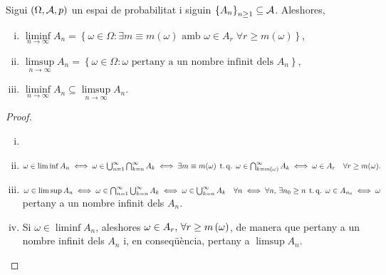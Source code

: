 \begin{prop}
    Sigui $\left(\Omega,\mathcal{A},p\right)$ un espai de probabilitat i siguin $\left\{ A_n\right\}_{n\geq1} \subseteq \mathcal{A}$. Aleshores,
    \begin{enumerate}[i)]
        \item $\liminf\limits_{n\to\infty} A_n= \left\{\omega\in\Omega\colon \exists m\equiv m(\omega) \text{ amb } \omega\in A_r \;\forall r\geq m(\omega)\right\}$,
        \item $\limsup\limits_{n\to\infty} A_n= \left\{\omega\in\Omega \colon \omega \text{ pertany a un nombre infinit dels } A_n\right\}$,
        \item $\liminf\limits_{n\to\infty} A_n \subseteq \limsup\limits_{n\to\infty} A_n$.
    \end{enumerate}
\end{prop}
\begin{proof}
    \begin{enumerate}[i)]
        \item[]
        \item $\omega\in\liminf{A_n} \iff \omega\in\bigcup_{n=1}^{\infty}\bigcap_{k=n}^{\infty} A_k \iff
        \exists m \equiv m(\omega) \operatorname{\;t.q.\;} \omega\in\bigcap_{k=m(\omega)}^{\infty} A_k \iff
        \omega\in A_r \quad\forall r \ge m(\omega).$
        \item $\omega\in\limsup{A_n} \iff \omega\in\bigcap_{n=1}^{\infty}\bigcup_{k=n}^{\infty} A_k \iff
        \omega\in\bigcup_{k=n}^{\infty}A_k \quad\forall n \iff \forall n,\, \exists n_0\geq n \operatorname{\;t.q.\;} \omega\in A_{n_0}\iff \omega$ pertany a un nombre infinit dels $A_n$. 
        \item Si $\omega\in\liminf A_n$, aleshores $\omega\in A_r, \, \forall r\geq m\left(\omega\right)$, de manera que pertany a un nombre infinit dels $A_n$ i, en conseqüència, pertany a $\limsup A_n$.
    \end{enumerate}
\end{proof}

